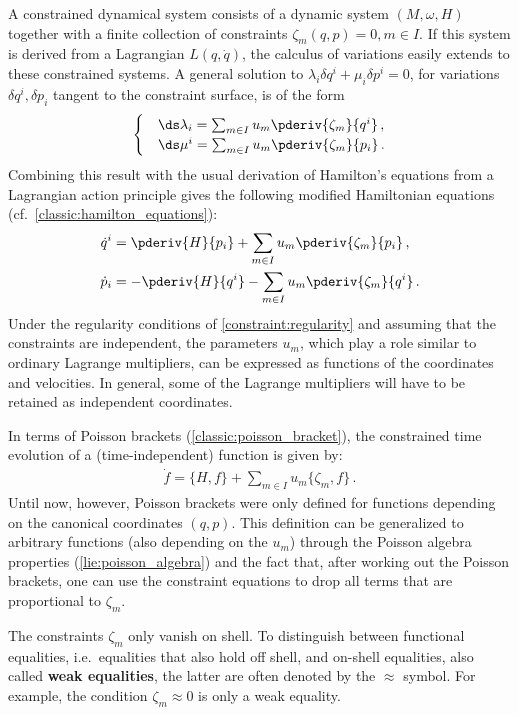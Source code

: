     A constrained dynamical system consists of a dynamic system $(M,\omega,H)$ together with a finite collection of constraints $\zeta_m(q,p)=0,m\in I$. If this system is derived from a Lagrangian $L(q,\dot{q})$, the calculus of variations easily extends to these constrained systems. A general solution to $\lambda_i\delta q^i + \mu_i\delta p^i = 0$, for variations $\delta q^i,\delta p_i$ tangent to the constraint surface, is of the form
    \begin{gather}
	\begin{cases}
            &\ds\lambda_i = \sum_{m\in I}u_m\pderiv{\zeta_m}{q^i}\,,\\
            &\ds\mu^i = \sum_{m\in I}u_m\pderiv{\zeta_m}{p_i}\,.
        \end{cases}
    \end{gather}
    Combining this result with the usual derivation of Hamilton’s equations from a Lagrangian action principle gives the following modified Hamiltonian equations (cf.~\cref{classic:hamilton_equations}):
    \begin{align}
        \dot{q}^i &= \pderiv{H}{p_i} + \sum_{m\in I}u_m\pderiv{\zeta_m}{p_i}\,,\\
        \dot{p}_i &= -\pderiv{H}{q^i} - \sum_{m\in I}u_m\pderiv{\zeta_m}{q^i}\,.
    \end{align}
    Under the regularity conditions of \cref{constraint:regularity} and assuming that the constraints are independent, the parameters $u_m$, which play a role similar to ordinary Lagrange multipliers, can be expressed as functions of the coordinates and velocities. In general, some of the Lagrange multipliers will have to be retained as independent coordinates.
    
    In terms of Poisson brackets (\cref{classic:poisson_bracket}), the constrained time evolution of a (time-independent) function is given by:
    \begin{gather}
        \label{constraint:modified_poisson_evolution}
        \dot{f} = \{H,f\} + \sum_{m\in I}u_m\{\zeta_m,f\}\,.
    \end{gather}
    Until now, however, Poisson brackets were only defined for functions depending on the canonical coordinates $(q,p)$. This definition can be generalized to arbitrary functions (also depending on the $u_m$) through the Poisson algebra properties (\cref{lie:poisson_algebra}) and the fact that, after working out the Poisson brackets, one can use the constraint equations to drop all terms that are proportional to $\zeta_m$.
    \begin{notation}
        The constraints $\zeta_m$ only vanish on shell. To distinguish between functional equalities, i.e.~equalities that also hold off shell, and on-shell equalities, also called \textbf{weak equalities}, the latter are often denoted by the $\approx$ symbol. For example, the condition $\zeta_m\approx0$ is only a weak equality.
    \end{notation}

